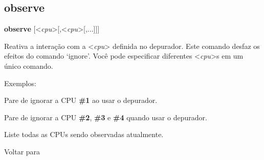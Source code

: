 \documentclass[letterpaper,10pt,brazil]{sphinxmanual}
\begin{document}
\subsection{observe}
\label{debugger/execution:observe}\label{debugger/execution:debugger-command-observe}
\begin{DUlineblock}{0em}
\item[]
\begin{DUlineblock}{\DUlineblockindent}
\item[] \textbf{observe} {[}\textless{}\emph{cpu}\textgreater{}{[},\textless{}\emph{cpu}\textgreater{}{[},...{]}{]}{]}
\item[] 
\end{DUlineblock}
\item[] Reativa a interação com a \textless{}\emph{cpu}\textgreater{} definida no depurador. Este comando desfaz os efeitos do comando `ignore'. Você pode especificar diferentes \textless{}\emph{cpu}\textgreater{}s em um único comando.
\item[] 
\item[] Exemplos:
\item[] 
\item[]
\begin{DUlineblock}{\DUlineblockindent}
\item[] 
\item[] 
\end{DUlineblock}
\item[] Pare de ignorar a CPU \textbf{\#1} ao usar o depurador.
\item[] 
\item[]
\begin{DUlineblock}{\DUlineblockindent}
\item[] 
\item[] 
\end{DUlineblock}
\item[] Pare de ignorar a CPU \textbf{\#2}, \textbf{\#3} e \textbf{\#4} quando usar o depurador.
\item[] 
\item[]
\begin{DUlineblock}{\DUlineblockindent}
\item[] 
\item[] 
\end{DUlineblock}
\item[] Liste todas as CPUs sendo observadas atualmente.
\item[] 
\item[] Voltar para {\hyperref[debugger/execution:debugger\string-execution\string-list]{}}
\end{DUlineblock}
\begin{quote}
\label{debugger/execution:debugger-command-trace}\end{quote}
\end{document}
